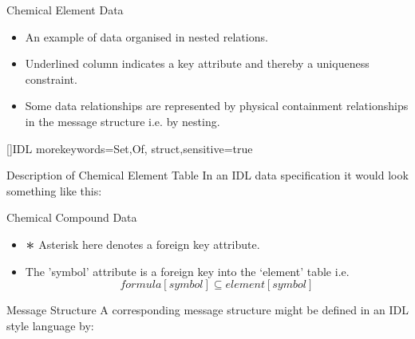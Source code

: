 

\begin{frame}{Chemical Element Data}
\scalebox{0.75}{

}

\begin{itemize}
	\item An example of data organised in nested relations.
	\item Underlined column indicates a key attribute and thereby a uniqueness constraint.
	\item Some data relationships are represented by physical containment relationships in the message structure i.e. by nesting.
\end{itemize}
\end{frame}

[]{IDL}
{morekeywords={Set,Of, struct},sensitive=true}


\begin{frame}[fragile]{Description of Chemical Element Table}
In an IDL data specification it would look something like this:

\end{frame}

\begin{frame}{Chemical Compound Data}
\scalebox{0.75}{

}
\begin{itemize}
\item $\largeAsterisk$ Asterisk here denotes a foreign key attribute. 
\item The 'symbol' attribute is a foreign key into the `element' table i.e.
	\begin{equation}
	              formula[symbol] \subseteq element[symbol]
	\end{equation}
\end{itemize}	
\end{frame}

\begin{frame}[fragile]{Message Structure}
A corresponding message structure might be defined 
in an IDL style language by:


\end{frame}


